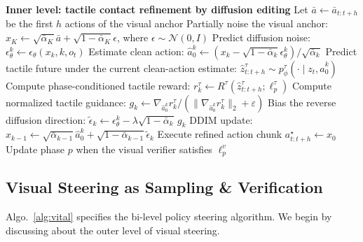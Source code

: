 \begin{algorithm}[t]
\begin{algorithmic}[1]
    \Statex \textbf{Inner level: tactile contact refinement by diffusion editing}
    \State Let $\bar a\gets \bar a_{t:t+h}$ be the first $h$ actions of the visual anchor
    \State Partially noise the visual anchor:
    $x_K\gets \sqrt{\bar\alpha_K}\bar a+
    \sqrt{1-\bar\alpha_K}\epsilon$, where $\epsilon\sim\mathcal N(0,I)$
        \State Predict diffusion noise:
        $\epsilon^k_\theta\gets \epsilon_\theta(x_k,k,o_t)$
        \State Estimate clean action:
        $\hat a^k_0\gets
        (x_k-\sqrt{1-\bar\alpha_k}\epsilon^k_\theta)/\sqrt{\bar\alpha_k}$
        \State Predict tactile future under the current clean-action estimate:
        $\hat z^\tau_{t:t+h}\sim p_\phi^\tau(\cdot \mid z_t,\hat a^k_0)$
        \State Compute phase-conditioned tactile reward:
        $r^\tau_k\gets R^\tau(\hat z^\tau_{t:t+h};\ell^\tau_p)$
        \State Compute normalized tactile guidance:
        $g_k\gets \nabla_{\hat a^k_0} r^\tau_k /
        (\|\nabla_{\hat a^k_0} r^\tau_k\|_2+\varepsilon)$
        \State Bias the reverse diffusion direction:
        $\tilde\epsilon_k\gets
        \epsilon^k_\theta-\lambda\sqrt{1-\bar\alpha_k}\,g_k$
        \State DDIM update:
        $x_{k-1}\gets
        \sqrt{\bar\alpha_{k-1}}\hat a^k_0+
        \sqrt{1-\bar\alpha_{k-1}}\tilde\epsilon_k$
    \EndFor
    \State Execute refined action chunk $a^\star_{t:t+h}\gets x_0$
    \State Update phase $p$ when the visual verifier satisfies $\ell^v_p$
\EndWhile
\end{algorithmic}
\end{algorithm}






\subsection{Visual Steering as Sampling \& Verification}
\label{app:implement_visual_steering}

Algo.~\ref{alg:vital} specifies the bi-level policy steering algorithm. We begin by discussing about the outer level of visual steering.

